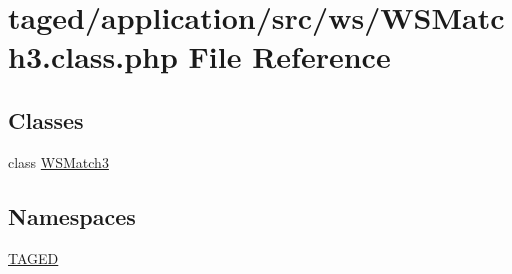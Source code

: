 \hypertarget{_w_s_match3_8class_8php}{}\section{taged/application/src/ws/\+W\+S\+Match3.class.\+php File Reference}
\label{_w_s_match3_8class_8php}
\subsection*{Classes}
\begin{DoxyCompactItemize}
\item 
class \hyperlink{class_w_s_match3}{W\+S\+Match3}
\end{DoxyCompactItemize}
\subsection*{Namespaces}
\begin{DoxyCompactItemize}
\item 
 \hyperlink{namespace_t_a_g_e_d}{T\+A\+G\+ED}
\end{DoxyCompactItemize}
